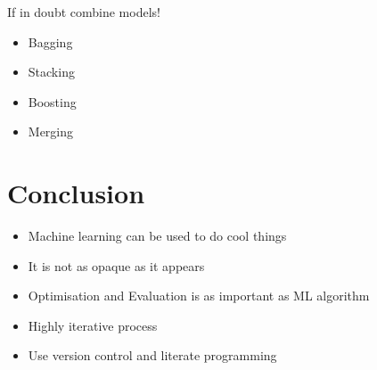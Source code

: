 \documentclass[ignorenonframetext,]{beamer}
\begin{document}
\begin{frame}{If in doubt combine models!}

\begin{itemize}
\itemsep1pt\parskip0pt
\item
  Bagging
\item
  Stacking
\item
  Boosting
\item
  Merging
\end{itemize}

\end{frame}

\section{Conclusion}\label{conclusion}

\begin{frame}

\begin{itemize}
\itemsep1pt\parskip0pt
\item
  Machine learning can be used to do cool things
\item
  It is not as opaque as it appears
\item
  Optimisation and Evaluation is as important as ML algorithm
\item
  Highly iterative process
\item
  Use version control and literate programming
\end{itemize}

\end{frame}
\end{document}
